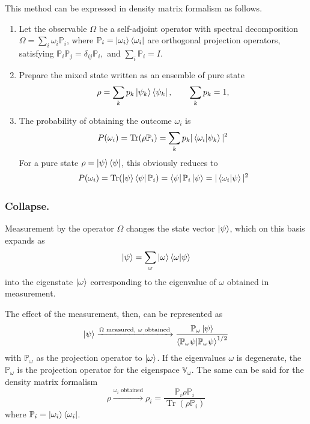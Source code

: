 \documentclass[../../../main.tex]{subfiles}
\begin{document}
This method can be expressed in density matrix formalism as follows.
\begin{enumerate}
    \item Let the observable $\Omega$ be a self-adjoint operator with spectral decomposition $\Omega = \sum_i \omega_i   \mathbb{P}_i$, where $\mathbb{P}_i = \ket{\omega_i}\bra{\omega_i}$ are orthogonal projection operators, satisfying $\mathbb{P}_i \mathbb{P}_j = \delta_{ij}\mathbb{P}_i,$ and $\sum_i \mathbb{P}_i = I$.
    \item Prepare the mixed state written as an ensemble of pure state
          \begin{equation*}
              \rho = \sum_k p_k \ket{\psi_k}\bra{\psi_k},
              \qquad \sum_k p_k = 1,
          \end{equation*}
    \item The probability of obtaining the outcome $\omega_i$ is
          \begin{equation*}
              P(\omega_i) = \mathrm{Tr}(\rho \mathbb{P}_i)
              = \sum_k p_k   |\braket{\omega_i|\psi_k}|^2
          \end{equation*}
          For a pure state $\rho = \ket{\psi}\bra{\psi}$, this obviously reduces to
          \begin{equation*}
              P(\omega_i)
              = \mathrm{Tr}(\ket{\psi}\bra{\psi}\mathbb{P}_i)
              = \bra{\psi}\mathbb{P}_i\ket{\psi}
              = |\braket{\omega_i|\psi}|^2
          \end{equation*}
\end{enumerate}

\subsubsection{Collapse.}
Measurement by the operator $\Omega$ changes the state vector $\ket{\psi}$, which on this basis expands as
\begin{equation*}
    \ket{\psi}=\sum_\omega \ket{\omega}\braket{\omega|\psi}
\end{equation*}
into the eigenstate $\ket{\omega}$ corresponding to the eigenvalue of $\omega$  obtained in measurement.

The effect of the measurement, then, can be represented as
\begin{equation*}
    \ket{\psi}\xrightarrow{\Omega\text{ measured, }\omega\text{ obtained}}\frac{\mathbb{P}_\omega \ket{\psi }}{\braket{\mathbb{P}_\omega\psi|\mathbb{P }_\omega \psi}^{1/2}}
\end{equation*}
with $\mathbb{P }_\omega$ as the projection operator to $\ket{\omega}$.
If the eigenvalues $\omega$ is degenerate, the $\mathbb{P }_\omega$ is the projection operator for the eigenspace $\mathbb{V}_\omega$.
The same can be said for the density matrix formalism
\begin{equation*}
    \rho  \xrightarrow{\omega_i\text{ obtained}}\rho_i
    = \frac{\mathbb{P}_i \rho \mathbb{P}_i}{\operatorname{Tr}(\rho \mathbb{P}_i)}
\end{equation*}
where $\mathbb{P}_i = \ket{\omega_i}\bra{\omega_i}$.
\end{document}
